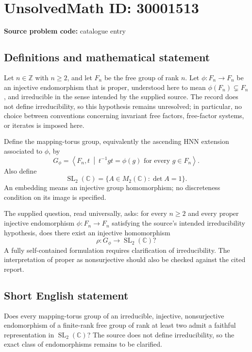 \documentclass[11pt]{article}
\newcommand{\Z}{\mathbb{Z}}
\newcommand{\C}{\mathbb{C}}
\begin{document}
\section*{UnsolvedMath ID: 30001513}
\textbf{Source problem code:} catalogue entry
\subsection{Definitions and mathematical statement}
Let \(n\in\Z\) with \(n\ge 2\), and let \(F_n\) be the free group of rank \(n\). Let \(\phi:F_n\to F_n\) be an injective endomorphism that is proper, understood here to mean \(\phi(F_n)\subsetneq F_n\), and irreducible in the sense intended by the supplied source. The record does not define irreducibility, so this hypothesis remains unresolved; in particular, no choice between conventions concerning invariant free factors, free-factor systems, or iterates is imposed here.

Define the mapping-torus group, equivalently the ascending HNN extension associated to \(\phi\), by
\[
G_\phi=\left\langle F_n,t\ \middle|\ t^{-1}gt=\phi(g)\text{ for every }g\in F_n\right\rangle.
\]
Also define
\[
\operatorname{SL}_2(\C)=\{A\in M_2(\C):\det A=1\}.
\]
An embedding means an injective group homomorphism; no discreteness condition on its image is specified.

The supplied question, read universally, asks: for every \(n\ge2\) and every proper injective endomorphism \(\phi:F_n\to F_n\) satisfying the source's intended irreducibility hypothesis, does there exist an injective homomorphism
\[
\rho:G_\phi\longrightarrow\operatorname{SL}_2(\C)?
\]
A fully self-contained formulation requires clarification of irreducibility. The interpretation of proper as nonsurjective should also be checked against the cited report.
\subsection{Short English statement}
Does every mapping-torus group of an irreducible, injective, nonsurjective endomorphism of a finite-rank free group of rank at least two admit a faithful representation in \(\operatorname{SL}_2(\C)\)? The source does not define irreducibility, so the exact class of endomorphisms remains to be clarified.
\end{document}
